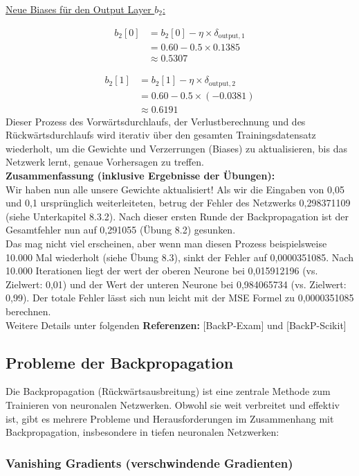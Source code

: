 \documentclass[12pt]{article}
\begin{document}
\underline{Neue Biases für den Output Layer \( b_2 \):}

\begin{align*}
b_2[0] &= b_2[0] - \eta \times \delta_{\text{output}, 1} \\
&= 0.60 - 0.5 \times 0.1385 \\
& \approx{0.5307}
\end{align*}

\begin{align*}
b_2[1] &= b_2[1] - \eta \times \delta_{\text{output}, 2} \\
&= 0.60 - 0.5 \times (-0.0381) \\
& \approx{0.6191}
\end{align*}
%
Dieser Prozess des Vorwärtsdurchlaufs, der Verlustberechnung und des Rückwärtsdurchlaufs wird iterativ über den gesamten Trainingsdatensatz wiederholt, um die Gewichte und Verzerrungen (Biases) zu aktualisieren, bis das Netzwerk lernt, genaue Vorhersagen zu treffen.\\[0.2cm]
%
\textbf{Zusammenfassung (inklusive Ergebnisse der Übungen):}\\
Wir haben nun alle unsere Gewichte aktualisiert! Als wir die Eingaben von 0,05 und 0,1 ursprünglich weiterleiteten, betrug der Fehler des Netzwerks 0,298371109 (siehe Unterkapitel 8.3.2). Nach dieser ersten Runde der Backpropagation ist der Gesamtfehler nun auf 0,291055 (Übung 8.2) gesunken. \\
Das mag nicht viel erscheinen, aber wenn man diesen Prozess beispielsweise 10.000 Mal wiederholt (siehe Übung 8.3), sinkt der Fehler auf 0,0000351085. Nach 10.000 Iterationen liegt der wert der oberen Neurone bei 0,015912196 (vs. Zielwert: 0,01) und der Wert der unteren Neurone bei 0,984065734 (vs. Zielwert: 0,99). Der totale Fehler lässt sich nun leicht mit der MSE Formel zu 0,0000351085 berechnen. \\[0.4cm]
%
Weitere Details unter folgenden \textbf{Referenzen:} [BackP-Exam] und [BackP-Scikit] 
%
\subsection{Probleme der Backpropagation} 
Die Backpropagation (Rückwärtsausbreitung) ist eine zentrale Methode zum Trainieren von neuronalen Netzwerken. Obwohl sie weit verbreitet und effektiv ist, gibt es mehrere Probleme und Herausforderungen im Zusammenhang mit Backpropagation, insbesondere in tiefen neuronalen Netzwerken:
%
\subsubsection{Vanishing Gradients (verschwindende Gradienten)}
\end{document}
